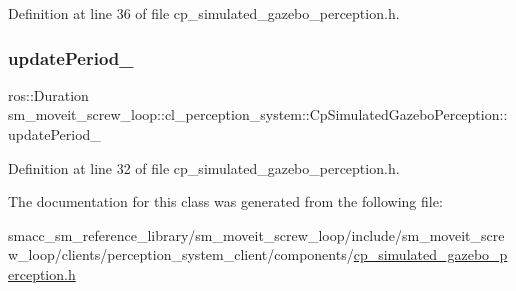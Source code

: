 Definition at line 36 of file cp\+\_\+simulated\+\_\+gazebo\+\_\+perception.\+h.

\mbox{\label{classsm__moveit__screw__loop_1_1cl__perception__system_1_1CpSimulatedGazeboPerception_ad3006649b94562b4539b92ff226dea93}} 
\subsubsection{\texorpdfstring{update\+Period\+\_\+}{updatePeriod\_}}
{\footnotesize\ttfamily ros\+::\+Duration sm\+\_\+moveit\+\_\+screw\+\_\+loop\+::cl\+\_\+perception\+\_\+system\+::\+Cp\+Simulated\+Gazebo\+Perception\+::update\+Period\+\_\+\hspace{0.3cm}{\ttfamily [private]}}



Definition at line 32 of file cp\+\_\+simulated\+\_\+gazebo\+\_\+perception.\+h.



The documentation for this class was generated from the following file\+:\begin{DoxyCompactItemize}
\item 
smacc\+\_\+sm\+\_\+reference\+\_\+library/sm\+\_\+moveit\+\_\+screw\+\_\+loop/include/sm\+\_\+moveit\+\_\+screw\+\_\+loop/clients/perception\+\_\+system\+\_\+client/components/\hyperlink{sm__moveit__screw__loop_2include_2sm__moveit__screw__loop_2clients_2perception__system__client_23d4c1f64f87d25d974d8ffd55c752b87}{cp\+\_\+simulated\+\_\+gazebo\+\_\+perception.\+h}\end{DoxyCompactItemize}
